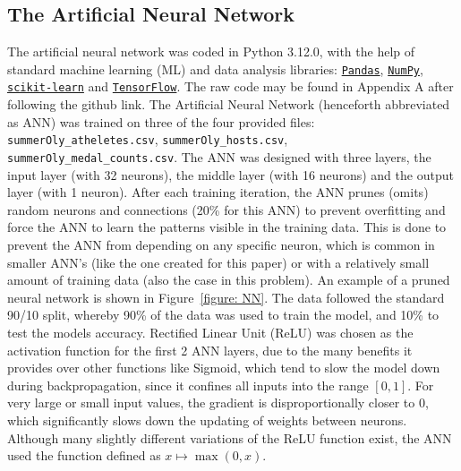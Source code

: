 \documentclass{mcmthesis}
\begin{document}
\subsection{The Artificial Neural Network}
The artificial neural network was coded in Python 3.12.0, with the help of standard machine learning (ML) and data analysis libraries: \href{https://pandas.pydata.org/}{\texttt{Pandas}}, \href{https://numpy.org/}{\texttt{NumPy}}, \href{https://scikit-learn.org/stable/}{\texttt{scikit-learn}} and \href{https://www.tensorflow.org/}{\texttt{TensorFlow}}. The raw code may be found in Appendix A after following the github link. The Artificial Neural Network (henceforth abbreviated as ANN) was trained on three of the four provided files: \texttt{summerOly\_atheletes.csv}, \texttt{summerOly\_hosts.csv}, \\ \texttt{summerOly\_medal\_counts.csv}. The ANN was designed with three layers, the input layer (with 32 neurons), the middle layer (with 16 neurons) and the output layer (with 1 neuron). After each training iteration, the ANN prunes (omits) random neurons and connections (20\% for this ANN) to prevent overfitting and force the ANN to learn the patterns visible in the training data. This is done to prevent the ANN from depending on any specific neuron, which is common in smaller ANN's (like the one created for this paper) or with a relatively small amount of training data (also the case in this problem). An example of a pruned neural network is shown in Figure~\ref{figure: NN}. The data followed the standard 90/10 split, whereby 90\% of the data was used to train the model, and 10\% to test the models accuracy. Rectified Linear Unit (ReLU) was chosen as the activation function for the first 2 ANN layers, due to the many benefits it provides over other functions like Sigmoid, which tend to slow the model down during backpropagation, since it confines all inputs into the range $[0, 1]$. For very large or small input values, the gradient is disproportionally closer to 0, which significantly slows down the updating of weights between neurons. Although many slightly different variations of the ReLU function exist, the ANN used the function defined as $x\mapsto \max(0, x)$.
\end{document}
